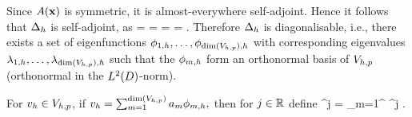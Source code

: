 
Since $A(\mathbf{x})$ is symmetric, it is almost-everywhere self-adjoint. Hence it follows that $\Delta_{h}$ is self-adjoint, as
\beqs
\IPLtD{\Deltah \wh}{\vh} =  =  = \overline{\IPLtD{\Deltah \vh}{\wh}} = \IPLtD{\wh}{\Deltah \vh}.
\eeqs
Therefore $\Delta_{h}$ is diagonalisable, i.e., there exists a set of eigenfunctions $\phioh,\ldots,\phidimVhph$  with corresponding eigenvalues $\lambdaoh, \ldots, \lambdadimVhph$ such that the $\phi_{m,h}$ form an orthonormal basis of $V_{h,p}$ (orthonormal in the $\LtD$-norm).

For $v_{h} \in V_{h,p}$, if $\vh = \sum_{m=1}^{\dimVhp} \am \phimh,$ then for $j \in \mathbb R$ define
\beqs
\Deltah^j \vh = \sum_{m=1}^{\dimVhp} \lambdamh^j \am \phimh.
\eeqs

\ede




